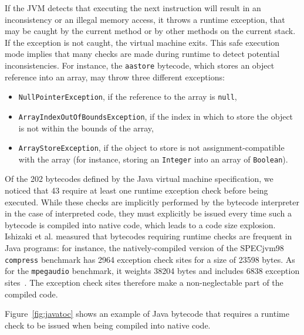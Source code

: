 If the JVM detects that executing the next instruction will result in an inconsistency or an illegal memory access, it throws a runtime exception, that may be caught by the current method or by other methods on the current stack. If the exception is not caught, the virtual machine exits. This safe execution mode implies that many checks are made during runtime to detect potential inconsistencies. For instance, the \texttt{aastore} bytecode, which stores an object reference into an array, may throw three different exceptions:
\begin{itemize}
\item \texttt{NullPointerException}, if the reference to the array is \texttt{null},
\item \texttt{ArrayIndexOutOfBoundsException}, if the index in which to store the object is not within the bounds of the array,
\item \texttt{ArrayStoreException}, if the object to store is not assignment-compatible with the array (for instance, storing an \texttt{Integer} into an array of \texttt{Boolean}).
\end{itemize}

Of the 202 bytecodes defined by the Java virtual machine specification, we noticed that 43 require at least one runtime exception check before being executed. While these checks are implicitly performed by the bytecode interpreter in the case of interpreted code, they must explicitly be issued every time such a bytecode is compiled into native code, which leads to a code size explosion. Ishizaki et al. measured that bytecodes requiring runtime checks are frequent in Java programs: for instance, the natively-compiled version of the SPECjvm98 \texttt{compress} benchmark has 2964 exception check sites for a size of 23598 bytes. As for the \texttt{mpegaudio} benchmark, it weights 38204 bytes and includes 6838 exception sites~\cite{Ishizaki1999}. The exception check sites therefore make a non-neglectable part of the compiled code.

Figure~\ref{fig:javatoc} shows an example of Java bytecode that requires a runtime check to be issued when being compiled into native code.

